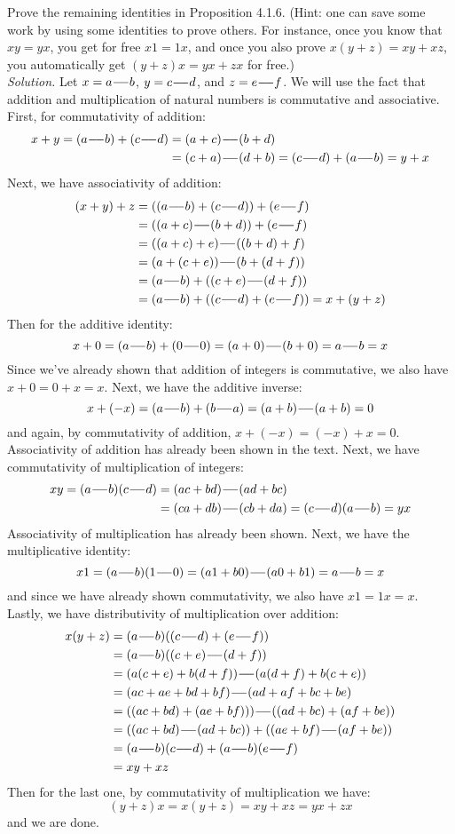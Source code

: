 \documentclass{amsart}
\theoremstyle{definition}
\newcommand{\soln}{\newline\textit{Solution.} }
\newcommand{\mns}{\hspace{-2pt}-\hspace{-4.1pt}-{}}
\begin{document}
\subsubsection{} Prove the remaining identities in Proposition 4.1.6. (Hint: one can save some work by using some identities to prove others. For instance, once you know that $xy=yx$, you get for free $x1=1x$, and once you also prove $x(y+z)=xy+xz$, you automatically get $(y+z)x=yx+zx$ for free.) \\
\soln Let $x=a\mns b$, $y=c\mns d$, and $z=e\mns f$. We will use the fact that addition and multiplication of natural numbers is commutative and associative. First, for commutativity of addition:
\begin{align*}
x+y=(a\mns b)+(c\mns d)&=(a+c)\mns (b+d)\\
&=(c+a)\mns (d+b)=(c\mns d)+(a\mns b)=y+x
\end{align*}
Next, we have associativity of addition:
\begin{align*}
(x+y)+z&=((a\mns b)+(c\mns d))+(e\mns f)\\
&=((a+c)\mns(b+d))+(e\mns f) \\
&=((a+c)+e)\mns((b+d)+f) \\
&=(a+(c+e))\mns(b+(d+f)) \\
&=(a\mns b)+((c+e)\mns(d+f)) \\
&=(a\mns b)+((c\mns d)+(e\mns f))=x+(y+z)
\end{align*}
Then for the additive identity:
\[
x+0=(a\mns b)+(0\mns 0)=(a+0)\mns (b+0)=a\mns b=x
\]
Since we've already shown that addition of integers is commutative, we also have $x+0=0+x=x$. Next, we have the additive inverse:
\[
x+(-x)=(a\mns b)+(b\mns a)=(a+b)\mns (a+b)=0
\]
 and again, by commutativity of addition, $x+(-x)=(-x)+x=0$. Associativity of addition has already been shown in the text. Next, we have commutativity of multiplication of integers: 
\begin{align*}
xy=(a\mns b)(c\mns d)&=(ac+bd)\mns(ad+bc)\\
&=(ca+db)\mns(cb+da)=(c\mns d)(a\mns b)=yx
\end{align*}
Associativity of multiplication has already been shown. Next, we have the multiplicative identity: 
\[
x1=(a\mns b)(1\mns 0)=(a1+b0)\mns(a0+b1)=a\mns b=x
\]
and since we have already shown commutativity, we also have $x1=1x=x$. Lastly, we have distributivity of multiplication over addition:
\begin{align*}
x(y+z)&=(a\mns b)((c\mns d)+(e\mns f))\\
&=(a\mns b)((c+e)\mns (d+f)) \\
&=(a(c+e)+b(d+f))\mns (a(d+f)+b(c+e)) \\
&=(ac+ae+bd+bf)\mns(ad+af+bc+be) \\
&=((ac+bd)+(ae+bf)))\mns((ad+bc)+(af+be)) \\
&=((ac+bd)\mns(ad+bc))+((ae+bf)\mns(af+be)) \\
&=(a\mns b)(c\mns d)+(a\mns b)(e\mns f) \\
&=xy+xz
\end{align*}
Then for the last one, by commutativity of multiplication we have:
\[
(y+z)x=x(y+z)=xy+xz=yx+zx
\]
and we are done. \\
\end{document}
